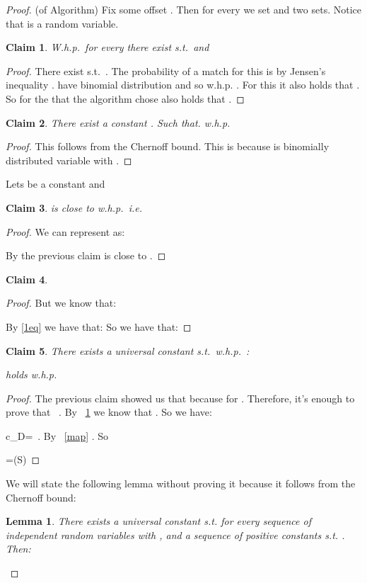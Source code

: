 \documentclass[11pt]{article}
\newcommand{\calO}{{\cal{O}}}
\newtheorem{lem}[thm]{Lemma}
\newtheorem{claim}{Claim}[section]
\newcommand{\be}{}
\newcommand{\envert}[1]{\left\lvert#1\right\rvert}
\let\abs=\envert
\newcommand{\bfE}{\textbf{E}}
\begin{document}
\begin{proof}(of Algorithm)
Fix some offset . Then for every  we set  and  two sets. Notice that  is a random variable.
\begin{claim}\label{1claim}
W.h.p.\ for every  there exist  s.t.\  and 
\end{claim}
\begin{proof}
There exist  s.t.\ . The probability of a match for this  is
 by Jensen's inequality
.
  have binomial distribution  and so w.h.p.
. For this   it also holds that . So for the  that the algorithm
chose also holds that .
\end{proof}
\begin{claim}
There exist a constant . Such
that.
 w.h.p.
\end{claim}
\begin{proof}
This follows from the Chernoff bound. This is because  is binomially
distributed variable  with .
\end{proof}
Lets  be a constant and 
\begin{claim}
 is close to  w.h.p.\ i.e.

\end{claim}
\begin{proof}
We can represent  as:

 
By the previous claim   is close to .
\end{proof}
\begin{claim}\label{expectation}

\end{claim}
\begin{proof}

 But we know that:


By \eqref{1eq} we have that: 
So we have that:

\end{proof}
\begin{claim}\label{bound}
There exists a universal constant   s.t.\ w.h.p.\ :

holds w.h.p.
\end{claim}
\begin{proof}
The previous claim showed us that  because  for . Therefore, it's enough to prove that \ .
By ~\ref{1claim} we know that . So we have:
\be
c_D=\leq \frac{C \bfE(\abs{A})D}{K}\ .
\ee
By ~\ref{map} .  So
\be
\frac{C \bfE(\abs{A})D}{K}=\calO(S)
\ee
\end{proof}
We will state the
following lemma without proving it because it follows from the Chernoff bound:
\begin{lem}\label{e-bound0}
There exists a universal constant  s.t. for every sequence of
independent random variables  with , and a sequence of positive constants 
s.t. . Then:


\end{lem}
\end{proof}
\end{document}
